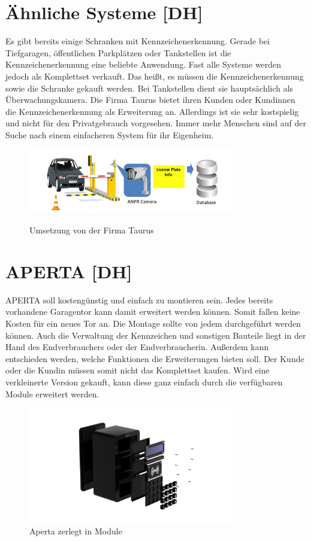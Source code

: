 \section{Ähnliche Systeme [DH]}
Es gibt bereits einige Schranken mit Kennzeichenerkennung. Gerade bei Tiefgaragen, öffentlichen Parkplätzen oder Tankstellen ist die Kennzeichenerkennung eine beliebte Anwendung. Fast alle Systeme werden jedoch als Komplettset verkauft. Das heißt, es müssen die Kennzeichenerkennung sowie die Schranke gekauft werden. Bei Tankstellen dient sie hauptsächlich als Überwachungskamera.
Die Firma Taurus bietet ihren Kunden oder Kundinnen die Kennzeichenerkennung als Erweiterung an. Allerdings ist sie sehr kostspielig und nicht für den Privatgebrauch vorgesehen. Immer mehr Menschen sind auf der Suche nach einem einfacheren System für ihr Eigenheim.

\begin{figure}[H]
    \centering
    \includegraphics[width=0.8\textwidth]{pics/Taurus_Umsetzung.png}
    \caption{Umsetzung von der Firma Taurus}
    \cite{TaurusUmsetzung}
  \end{figure}
  \newpage
  \section{APERTA [DH]}
  APERTA soll kostengünstig und einfach zu montieren sein. Jedes bereits vorhandene Garagentor kann damit erweitert werden können. Somit fallen keine Kosten für ein neues Tor an. Die Montage sollte von jedem durchgeführt werden können. Auch die Verwaltung der Kennzeichen und sonstigen Bauteile liegt in der Hand des Endverbrauchers oder der Endverbraucherin. Außerdem kann entschieden werden, welche Funktionen die Erweiterungen bieten soll. Der Kunde oder die Kundin müssen somit nicht das Komplettset kaufen. Wird eine verkleinerte Version gekauft, kann diese ganz einfach durch die verfügbaren Module erweitert werden.

  \begin{figure}[H]
    \centering
    \includegraphics[width=0.8\textwidth]{pics/Modular_Aperta.png}
    \caption{Aperta zerlegt in Module}
  \end{figure}